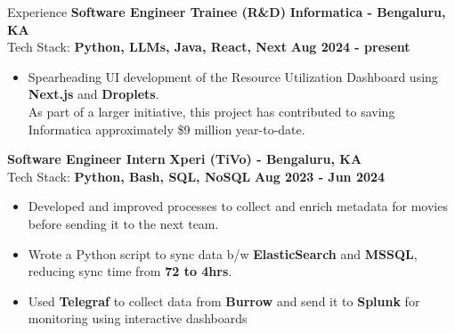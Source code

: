 \documentclass{resume} %
\begin{document}
\begin{rSection}{Experience}
{\bf Software Engineer Trainee (R\&D)} \hfill \textbf{Informatica - Bengaluru, KA} \\
Tech Stack: \textbf{Python, LLMs, Java, React, Next} \hfill \textbf{Aug 2024 - present}
\vspace{-0.5\baselineskip}
\begin{itemize}
    \item Spearheading UI development of the Resource Utilization Dashboard using {\bf Next.js} and {\bf Droplets}. \\
    As part of a larger initiative, this project has contributed to saving Informatica approximately \$9 million year-to-date.
\end{itemize}
    

{\bf Software Engineer Intern} \hfill \textbf{Xperi (TiVo) - Bengaluru, KA} \\
Tech Stack: \textbf{Python, Bash, SQL, NoSQL} \hfill \textbf{Aug 2023 - Jun 2024}
\vspace{-0.5\baselineskip}
\begin{itemize}[noitemsep, nolistsep]
    \item Developed and improved processes to collect and enrich metadata for movies before sending it to the next team.
\item Wrote a Python script to sync data b/w \textbf{ElasticSearch} and \textbf{MSSQL}, reducing sync time from \textbf{72 to 4hrs}.
\item Used \textbf{Telegraf} to collect data from \textbf{Burrow} and send it to \textbf{Splunk} for monitoring using interactive dashboards
\end{itemize}
\end{rSection}
\end{document}

